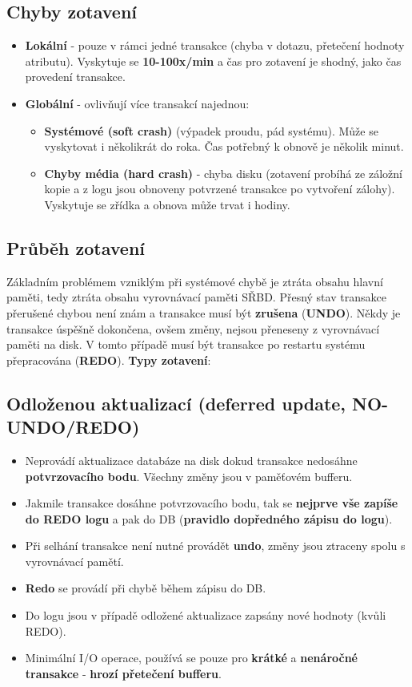 \subsection{Chyby zotavení}
\begin{itemize}
    \item\textbf{Lokální} - pouze v rámci jedné transakce (chyba v dotazu, přetečení hodnoty atributu). Vyskytuje se \textbf{10-100x/min} a čas pro zotavení je shodný, jako čas provedení transakce.
    \item\textbf{Globální} - ovlivňují více transakcí najednou:
          \begin{itemize}
              \item\textbf{Systémové (soft crash)} (výpadek proudu, pád systému). Může se vyskytovat i několikrát do roka. Čas potřebný k obnově je několik minut.
              \item\textbf{Chyby média (hard crash)} - chyba disku (zotavení probíhá ze záložní kopie a z logu jsou obnoveny potvrzené transakce po vytvoření zálohy). Vyskytuje se zřídka a obnova může trvat i hodiny.
          \end{itemize}
\end{itemize}

\subsection{Průběh zotavení}
Základním problémem vzniklým při systémové chybě je ztráta obsahu hlavní paměti, tedy ztráta obsahu vyrovnávací paměti SŘBD. Přesný stav transakce přerušené chybou není znám a transakce musí být \textbf{zrušena} (\textbf{UNDO}). Někdy je transakce úspěšně dokončena, ovšem změny, nejsou přeneseny z vyrovnávací paměti na disk. V tomto případě musí být transakce po restartu systému přepracována (\textbf{REDO}). \textbf{Typy zotavení}:

\subsection*{Odloženou aktualizací (deferred update, NO-UNDO/REDO)}
\begin{itemize}
    \item Neprovádí aktualizace databáze na disk dokud transakce nedosáhne\textbf{ potvrzovacího bodu}. Všechny změny jsou v paměťovém bufferu.
    \item Jakmile transakce dosáhne potvrzovacího bodu, tak se \textbf{nejprve vše zapíše do REDO logu} a pak do DB (\textbf{pravidlo dopředného zápisu do logu}).
    \item Při selhání transakce není nutné provádět \textbf{undo}, změny jsou ztraceny spolu s vyrovnávací pamětí.
    \item \textbf{Redo} se provádí při chybě během zápisu do DB.
    \item Do logu jsou v případě odložené aktualizace zapsány nové hodnoty (kvůli REDO).
    \item Minimální I/O operace, používá se pouze pro \textbf{krátké} a \textbf{nenáročné transakce} - \textbf{hrozí přetečení bufferu}.
\end{itemize}
